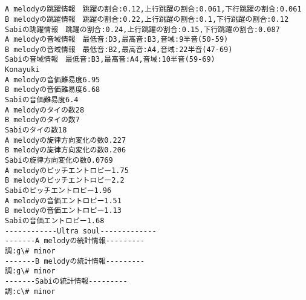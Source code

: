\documentclass[11pt]{article}
\begin{document}
    \begin{center}
    \end{center}
    { \hspace*{\fill} \\}
    
    \begin{center}
    \end{center}
    { \hspace*{\fill} \\}
    
    \begin{Verbatim}[commandchars=\\\{\}]
A melodyの跳躍情報　跳躍の割合:0.12,上行跳躍の割合:0.061,下行跳躍の割合:0.061
B melodyの跳躍情報　跳躍の割合:0.22,上行跳躍の割合:0.1,下行跳躍の割合:0.12
Sabiの跳躍情報　跳躍の割合:0.24,上行跳躍の割合:0.15,下行跳躍の割合:0.087
A melodyの音域情報　最低音:D3,最高音:B3,音域:9半音(50-59)
B melodyの音域情報　最低音:B2,最高音:A4,音域:22半音(47-69)
Sabiの音域情報　最低音:B3,最高音:A4,音域:10半音(59-69)
Konayuki
A melodyの音価難易度6.95
B melodyの音価難易度6.68
Sabiの音価難易度6.4
A melodyのタイの数28
B melodyのタイの数7
Sabiのタイの数18
A melodyの旋律方向変化の数0.227
B melodyの旋律方向変化の数0.206
Sabiの旋律方向変化の数0.0769
A melodyのピッチエントロピー1.75
B melodyのピッチエントロピー2.2
Sabiのピッチエントロピー1.96
A melodyの音価エントロピー1.51
B melodyの音価エントロピー1.13
Sabiの音価エントロピー1.68
------------Ultra soul-------------
-------A melodyの統計情報---------
調:g\# minor
-------B melodyの統計情報---------
調:g\# minor
-------Sabiの統計情報---------
調:c\# minor

    \end{Verbatim}

    \begin{center}
    \end{center}
    { \hspace*{\fill} \\}
    
    \begin{center}
    \end{center}
    { \hspace*{\fill} \\}
    
\end{document}
